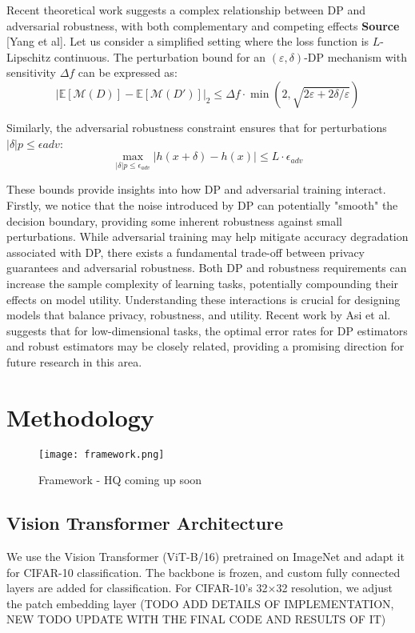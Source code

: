 \documentclass[11pt, conference]{IEEEtran}
\begin{document}
Recent theoretical work suggests a complex relationship between DP and adversarial robustness, with both complementary and competing effects \textbf{Source} \cite{Yang} [Yang et al]. Let us consider a simplified setting where the loss function is $L$-Lipschitz continuous.
The perturbation bound for an $(\varepsilon, \delta)$-DP mechanism with sensitivity $\Delta f$ can be expressed as:
\begin{equation}
|\mathbb{E}[\mathcal{M}(D)] - \mathbb{E}[\mathcal{M}(D')]|_2 \leq \Delta f \cdot \min\left(2, \sqrt{2\varepsilon + 2\delta/\varepsilon}\right)
\end{equation}

Similarly, the adversarial robustness constraint ensures that for perturbations $|\delta|p \leq \epsilon{adv}$:
\begin{equation}
\max_{|\delta|p \leq \epsilon_{adv}} |h(x + \delta) - h(x)| \leq L \cdot \epsilon_{adv}
\end{equation}

These bounds provide insights into how DP and adversarial training interact. Firstly, we notice that  the noise introduced by DP can potentially "smooth" the decision boundary, providing some inherent robustness against small perturbations. While adversarial training may help mitigate accuracy degradation associated with DP, there exists a fundamental trade-off between privacy guarantees and adversarial robustness. Both DP and robustness requirements can increase the sample complexity of learning tasks, potentially compounding their effects on model utility. Understanding these interactions is crucial for designing models that balance privacy, robustness, and utility. Recent work by \cite{Asi}Asi et al.
suggests that for low-dimensional tasks, the optimal error rates for DP estimators and robust estimators may be closely related, providing a promising direction for future research in this area.

\section{Methodology}

\begin{figure*}
    \centering
    \texttt{[image: framework.png]}
    \caption{Framework - HQ coming up soon}
    \label{fig:framework}
\end{figure*}


\subsection{Vision Transformer Architecture}
We use the Vision Transformer (ViT-B/16) pretrained on ImageNet and adapt it for CIFAR-10 classification. The backbone is frozen, and custom fully connected layers are added for classification. For CIFAR-10's 32×32 resolution, we adjust the patch embedding layer (TODO ADD DETAILS OF IMPLEMENTATION, NEW TODO UPDATE WITH  THE FINAL CODE AND RESULTS OF IT)
\end{document}
